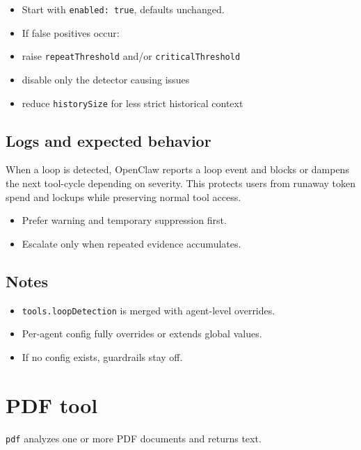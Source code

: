 \begin{itemize}
  \item Start with \texttt{enabled: true}, defaults unchanged.
  \item If false positives occur:
  \item raise \texttt{repeatThreshold} and/or \texttt{criticalThreshold}
  \item disable only the detector causing issues
  \item reduce \texttt{historySize} for less strict historical context
\end{itemize}


\subsection{Logs and expected behavior}


When a loop is detected, OpenClaw reports a loop event and blocks or dampens the next tool-cycle depending on severity.
This protects users from runaway token spend and lockups while preserving normal tool access.

\begin{itemize}
  \item Prefer warning and temporary suppression first.
  \item Escalate only when repeated evidence accumulates.
\end{itemize}


\subsection{Notes}


\begin{itemize}
  \item \texttt{tools.loopDetection} is merged with agent-level overrides.
  \item Per-agent config fully overrides or extends global values.
  \item If no config exists, guardrails stay off.
\end{itemize}



\clearpage

\section{PDF tool}


\texttt{pdf} analyzes one or more PDF documents and returns text.

